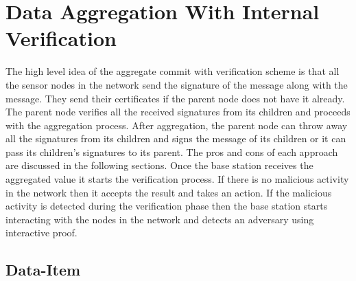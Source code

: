 \chapter{Data Aggregation With Internal Verification} %
\label{cha:Data Aggregation With Internal Verification}

	The high level idea of the aggregate commit with verification scheme is that all the sensor nodes in the network send the signature of the message along with the message.
	They send their certificates if the parent node does not have it already.
	The parent node verifies all the received signatures from its children and proceeds with the aggregation process.
	After aggregation, the parent node can throw away all the signatures from its children and signs the message of its children or it can pass its children's signatures to its parent. 
	The pros and cons of each approach are discussed in the following sections. 
	Once the base station receives the aggregated value it starts the verification process. 
	If there is no malicious activity in the network then  it accepts the result and takes an action.
	If the malicious activity is detected during the verification phase then the base station starts interacting with the nodes in the network and detects an adversary using interactive proof. 

\section{Data-Item}
	
